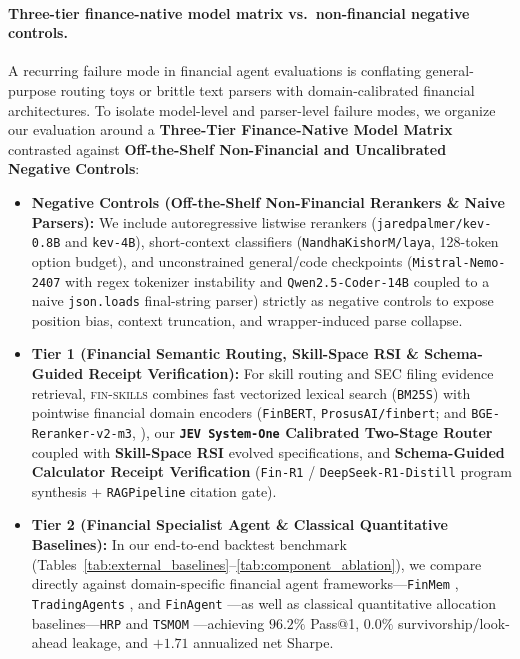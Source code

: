 \paragraph{Three-tier finance-native model matrix vs.\ non-financial negative controls.}
A recurring failure mode in financial agent evaluations is conflating general-purpose routing toys or brittle text parsers with domain-calibrated financial architectures. To isolate model-level and parser-level failure modes, we organize our evaluation around a \textbf{Three-Tier Finance-Native Model Matrix} contrasted against \textbf{Off-the-Shelf Non-Financial and Uncalibrated Negative Controls}:
\begin{itemize}
    \item \textbf{Negative Controls (Off-the-Shelf Non-Financial Rerankers \& Naive Parsers):} We include autoregressive listwise rerankers (\texttt{jaredpalmer/kev-0.8B} and \texttt{kev-4B}), short-context classifiers (\texttt{NandhaKishorM/laya}, 128-token option budget), and unconstrained general/code checkpoints (\texttt{Mistral-Nemo-2407} with regex tokenizer instability and \texttt{Qwen2.5-Coder-14B} coupled to a naive \texttt{json.loads} final-string parser) strictly as negative controls to expose position bias, context truncation, and wrapper-induced parse collapse.
    \item \textbf{Tier 1 (Financial Semantic Routing, Skill-Space RSI \& Schema-Guided Receipt Verification):} For skill routing and SEC filing evidence retrieval, \textsc{fin-skills} combines fast vectorized lexical search (\texttt{BM25S}) with pointwise financial domain encoders (\texttt{FinBERT}, \texttt{ProsusAI/finbert}; and \texttt{BGE-Reranker-v2-m3}, \citealt{chen2024bgem3}), our \textbf{\texttt{JEV System-One} Calibrated Two-Stage Router} coupled with \textbf{Skill-Space RSI} evolved specifications, and \textbf{Schema-Guided Calculator Receipt Verification} (\texttt{Fin-R1} / \texttt{DeepSeek-R1-Distill} program synthesis + \texttt{RAGPipeline} citation gate).
    \item \textbf{Tier 2 (Financial Specialist Agent \& Classical Quantitative Baselines):} In our end-to-end backtest benchmark (Tables~\ref{tab:external_baselines}--\ref{tab:component_ablation}), we compare directly against domain-specific financial agent frameworks---\texttt{FinMem} \citep{yu2024finmem}, \texttt{TradingAgents} \citep{xiao2024tradingagents}, and \texttt{FinAgent} \citep{zhang2024finagent}---as well as classical quantitative allocation baselines---\texttt{HRP} \citep{lopez2016building} and \texttt{TSMOM} \citep{moskowitz2012time}---achieving $96.2\%$ Pass@1, $0.0\%$ survivorship/look-ahead leakage, and $+1.71$ annualized net Sharpe.

\end{itemize}
